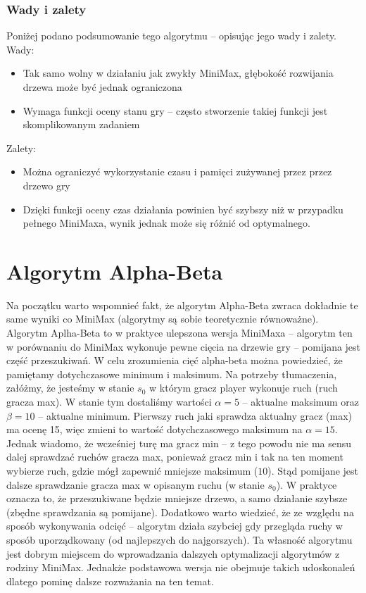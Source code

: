 \documentclass[polish,shortabstract,inz]{iithesis}
\begin{document}
\subsubsection{Wady i zalety}
Poniżej podano podsumowanie tego algorytmu -- opisując jego wady i zalety.
\newline Wady:
\begin{itemize}
  \item Tak samo wolny w działaniu jak zwykły MiniMax, głębokość rozwijania drzewa może być jednak ograniczona
  \item Wymaga funkcji oceny stanu gry -- często stworzenie takiej funkcji jest skomplikowanym zadaniem
\end{itemize}
Zalety:
\begin{itemize}
  \item Można ograniczyć wykorzystanie czasu i pamięci zużywanej przez przez drzewo gry
  \item Dzięki funkcji oceny czas działania powinien być szybszy niż w przypadku pełnego MiniMaxa, wynik jednak może się różnić od optymalnego.
\end{itemize}


\section{Algorytm Alpha-Beta}
Na początku warto wspomnieć fakt, że algorytm Alpha-Beta zwraca dokładnie te same wyniki co MiniMax (algorytmy są sobie teoretycznie równoważne).
Algorytm Aplha-Beta to w praktyce ulepszona wersja MiniMaxa -- algorytm ten w porównaniu do MiniMax wykonuje pewne cięcia na drzewie gry -- pomijana jest część przeszukiwań.
W celu zrozumienia cięć alpha-beta można powiedzieć, że pamiętamy dotychczasowe minimum i maksimum.
Na potrzeby tłumaczenia, załóżmy, że jesteśmy w stanie \( s_0 \) w którym gracz player wykonuje ruch (ruch gracza max).
W stanie tym dostaliśmy wartości \( \alpha = 5 \) -- aktualne maksimum oraz \( \beta = 10 \) -- aktualne minimum.
Pierwszy ruch jaki sprawdza aktualny gracz (max) ma ocenę 15, więc zmieni to wartość dotychczasowego maksimum na \( \alpha = 15 \).
Jednak wiadomo, że wcześniej turę ma gracz min -- z tego powodu nie ma sensu dalej sprawdzać ruchów gracza max, ponieważ gracz min i tak na ten moment wybierze ruch, gdzie mógł zapewnić mniejsze maksimum (\( 10 \)).
Stąd pomijane jest dalsze sprawdzanie gracza max w opisanym ruchu (w stanie \( s_0 \)).
W praktyce oznacza to, że przeszukiwane będzie mniejsze drzewo, a samo działanie szybsze (zbędne sprawdzania są pomijane).
Dodatkowo warto wiedzieć, że ze względu na sposób wykonywania odcięć -- algorytm działa szybciej gdy przegląda ruchy w sposób uporządkowany (od najlepszych do najgorszych).
Ta własność algorytmu jest dobrym miejscem do wprowadzania dalszych optymalizacji algorytmów z rodziny MiniMax.
Jednakże podstawowa wersja nie obejmuje takich udoskonaleń dlatego pominę dalsze rozważania na ten temat.
\end{document}
